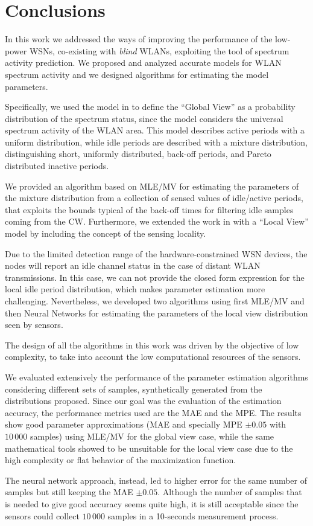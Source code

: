 \chapter{Conclusions} \label{sec:conclusion}

In this work we addressed the ways of improving the performance of the low-power \acp{WSN}, co-existing with \textit{blind} \acp{WLAN}, exploiting the tool of spectrum activity prediction. We proposed and analyzed accurate models for \ac{WLAN} spectrum activity and we designed algorithms for estimating the model parameters.

Specifically, we used the model in \cite{DSA-Emp} to define the ``Global View'' as a probability distribution of the spectrum status, since the model considers the universal spectrum activity of the \ac{WLAN} area. This model describes active periods with a uniform distribution, while idle periods are described with a mixture distribution, distinguishing short, uniformly distributed, back-off periods, and Pareto distributed inactive periods.

We provided an algorithm based on \ac{MLE}/\ac{MV} for estimating the parameters of the mixture distribution from a collection of sensed values of idle/active periods, that exploits the bounds typical of the back-off times for filtering idle samples coming from the \ac{CW}. Furthermore, we extended the work in \cite{DSA-Emp} with a ``Local View'' model by including the concept of the sensing locality.

Due to the limited detection range of the hardware-constrained \ac{WSN} devices, the nodes will report an idle channel status in the case of distant \ac{WLAN} transmissions. In this case, we can not provide the closed form expression for the local idle period distribution, which makes parameter estimation more challenging. Nevertheless, we developed two algorithms using first \ac{MLE}/\ac{MV} and then Neural Networks for estimating the parameters of the local view distribution seen by sensors.

The design of all the algorithms in this work was driven by the objective of low complexity, to take into account the low computational resources of the sensors.

We evaluated extensively the performance of the parameter estimation algorithms considering different sets of samples, synthetically generated from the distributions proposed. Since our goal was the evaluation of the estimation accuracy, the performance metrics used are the \ac{MAE} and the \ac{MPE}. The results show good parameter approximations (\ac{MAE} and specially \ac{MPE} $\pm 0.05$ with $10\,000$ samples) using \ac{MLE}/\ac{MV} for the global view case, while the same mathematical tools showed to be unsuitable for the local view case due to the high complexity or flat behavior of the maximization function.

The neural network approach, instead, led to higher error for the same number of samples but still keeping the \ac{MAE} $\pm 0.05$. Although the number of samples that is needed to give good accuracy seems quite high, it is still acceptable since the sensors could collect $10\,000$ samples in a 10-seconds measurement process.

